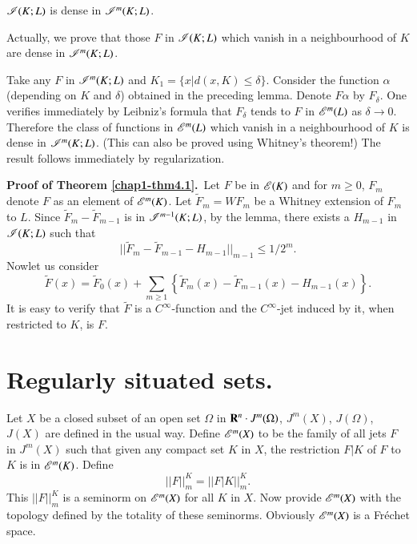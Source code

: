 \begin{lemma}\label{chap1-lem4.3}
$\mathscr{I}(K;L)$ is dense in $\mathscr{I}^{m}(K;L)$.
\end{lemma}

Actually, we prove that those $F$ in $\mathscr{I}(K;L)$ which vanish in a neighbourhood of $K$ are dense in $\mathscr{I}^{m}(K;L)$.

Take any $F$ in $\mathscr{I}^{m}(K;L)$ and $K_{1}=\{x|d(x,K)\leq \delta\}$. Consider the function $\alpha$ (depending on $K$ and $\delta$) obtained in the preceding lemma. Denote $F\alpha$ by $F_{\delta}$. One verifies immediately by Leibniz's formula that $F_{\delta}$ tends to $F$ in $\mathscr{E}^{m}(L)$ as $\delta\to 0$. Therefore the class of functions in $\mathscr{E}^{m}(L)$ which vanish in a neighbourhood of $K$ is dense in $\mathscr{I}^{m}(K;L)$. (This can also be proved using Whitney's theorem!) The result follows immediately by regularization.

\medskip
\noindent
{\bf Proof of Theorem \ref{chap1-thm4.1}.}~Let $F$ be in $\mathscr{E}(K)$ and for $m\geq 0$, $F_{m}$ denote $F$ as an element of $\mathscr{E}^{m}(K)$. Let $\widetilde{F}_{m}=WF_{m}$ be a Whitney extension of $F_{m}$ to $L$. Since $\widetilde{F}_{m}-\widetilde{F}_{m-1}$ is in $\mathscr{I}^{m-1}(K;L)$, by the lemma, there exists a $H_{m-1}$ in $\mathscr{I}(K;L)$ such that
$$
||\widetilde{F}_{m}-\widetilde{F}_{m-1}-H_{m-1}||_{m-1}\leq 1/2^{m}.
$$
Now\pageoriginale let us consider
$$
\widetilde{F}(x)=\widetilde{F}_{0}(x)+\sum\limits_{m\geq 1}\left\{\widetilde{F}_{m}(x)-\widetilde{F}_{m-1}(x)-H_{m-1}(x)\right\}.
$$
It is easy to verify that $\widetilde{F}$ is a $C^{\infty}$-function and the $C^{\infty}$-jet induced by it, when restricted to $K$, is $F$.

\section[Regularly situated sets]{Regularly situated sets.}\label{chap1-sec5}

Let $X$ be a closed subset of an open set $\Omega$ in $\mathbf{R}^{n}\cdot J^{m}(\Omega)$, $J^{m}(X)$, $J(\Omega)$, $J(X)$ are defined in the usual way. Define $\mathscr{E}^{m}(X)$ to be the family of all jets $F$ in $J^{m}(X)$ such that given any compact set $K$ in $X$, the restriction $F|K$ of $F$ to $K$ is in $\mathscr{E}^{m}(K)$. Define
$$
||F||^{K}_{m}=||F|K||^{K}_{m}.
$$
This $||F||^{K}_{m}$ is a seminorm on $\mathscr{E}^{m}(X)$ for all $K$ in $X$. Now provide $\mathscr{E}^{m}(X)$ with the topology defined by the totality of these seminorms. Obviously $\mathscr{E}^{m}(X)$ is a Fr\'echet space.

